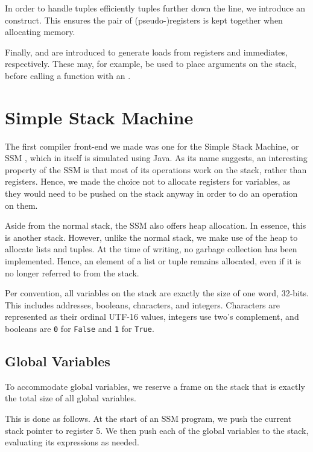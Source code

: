 In order to handle tuples efficiently tuples further down the line, we introduce an  construct.
This ensures the pair of (pseudo-)registers is kept together when allocating memory.

Finally,  and  are introduced to generate loads from registers and immediates, respectively.
These may, for example, be used to place arguments on the stack, before calling a function with an .


\section{Simple Stack Machine}

The first compiler front-end we made was one for the Simple Stack Machine, or SSM \cite{SSM}, which in itself is simulated using Java.
As its name suggests, an interesting property of the SSM is that most of its operations work on the stack, rather than registers.
Hence, we made the choice not to allocate registers for variables, as they would need to be pushed on the stack anyway in order to do an operation on them.

Aside from the normal stack, the SSM also offers heap allocation.
In essence, this is another stack.
However, unlike the normal stack, we make use of the heap to allocate lists and tuples.
At the time of writing, no garbage collection has been implemented.
Hence, an element of a list or tuple remains allocated, even if it is no longer referred to from the stack.

Per convention, all variables on the stack are exactly the size of one word, 32-bits.
This includes addresses, booleans, characters, and integers.
Characters are represented as their ordinal UTF-16 values, integers use two's complement, and booleans are \texttt{0} for \texttt{False} and \texttt{1} for \texttt{True}.


\subsection{Global Variables}

To accommodate global variables, we reserve a frame on the stack that is exactly the total size of all global variables.

This is done as follows.
At the start of an SSM program, we push the current stack pointer to register 5.
We then push each of the global variables to the stack, evaluating its expressions as needed.

